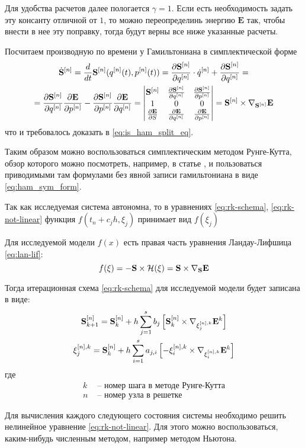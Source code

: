 Для удобства расчетов далее пологается $\gamma=1$. Если есть необходимость
задать эту консанту отличной от $1$, то можно переопределинь энергию $\mathbf
E$ так, чтобы внести в нее эту поправку, тогда будут верны все ниже указанные
расчеты.

Посчитаем производную по времени у Гамильтониана в симплектической
форме
\begin{multline}
    \dot{\mathbf S}^{[n]} = \frac{d}{dt}\mathbf S^{[n]}(q^{[n]}(t),p^{[n]}(t))=
    \frac{\partial \mathbf S^{[n]}}{\partial q^{[n]}} \cdot \dot q^{[n]} +
    \frac{\partial \mathbf S^{[n]}}{\partial q^{[n]}}
    =\\=
    \frac{\partial \mathbf S^{[n]}}{\partial q^{[n]}}
    \frac{\partial \mathbf E}{\partial p^{[n]}}
    -
    \frac{\partial \mathbf S^{[n]}}{\partial p^{[n]}}
    \frac{\partial \mathbf E}{\partial q^{[n]}}
    =
    \left|\begin{matrix}
        \mathbf{S}^{[n]} & \frac{\partial \mathbf{S}^{[n]}}{\partial q^{[n]}} &
        \frac{\partial \mathbf{S}^{[n]}}{\partial p^{[n]}}
        \\
        1 & 0 & 0
        \\
        \frac{\partial \mathbf E}{\partial S} &
        \frac{\partial \mathbf E}{\partial q^{[n]}} &
        \frac{\partial \mathbf E}{\partial p^{[n]}}
    \end{matrix}\right| = \mathbf{S}^{[n]} \times \nabla_{\mathbf{S}^{[n]}}\mathbf E
\end{multline}
что и требовалось доказать в \ref{eq:is_ham_split_eq}.

Таким образом можно воспользоваться симплектическим методом Рунге-Кутта,
обзор которого можно посмотреть, например, в статье \citet{Markiewicz1999},
и пользоваться приводимыми там
формулами без явной записи гамильтониана в виде \ref{eq:ham_sym_form}.


Так как исследуемая система автономна, то в уравнениях \ref{eq:rk-schema},
\ref{eq:rk-not-linear}
функция $f(t_n + c_jh, \xi_j)$ принимает вид $f(\xi_j)$

Для исследуемой модели $f(x)$ есть правая часть уравнения Ландау-Лифшица
\ref{eq:lan-lif}:
\begin{equation}
    f(\xi) = -\mathbf S \times \mathcal{H}(\xi) = \mathbf S \times \nabla_{\mathbf S}
    \mathbf E
\end{equation}

Тогда итерационная схема \ref{eq:rk-schema} для исследуемой
модели будет записана в виде:
\begin{gather}
    \mathbf S^{[n]}_{k+1} = \mathbf{S}^{[n]}_k + h\sum_{j=1}^s b_j \left[\mathbf{S}^{[n]}_k \times
    \nabla_{\xi^{[n],k}_j} \mathbf E^k \right]
    \\
    \xi_j^{[n], k} = \mathbf{S}^{[n]}_k + h\sum_{i=1}^s a_{j,i} \left[ -\xi_i^{[n],k}
    \times \nabla_{\xi^{[n],k}_i} \mathbf E^k \right]\label{eq:rk-not-linear}
\end{gather}
где
\begin{align}
    k &\text{ -- номер шага в методе Рунге-Кутта} \\
    n &\text{ -- номер узла в решетке}
\end{align}

Для вычисления каждого следующего состояния системы необходимо решить
нелинейное уравнение \ref{eq:rk-not-linear}. Для этого можно воспользоваться,
каким-нибудь численным методом, например методом Ньютона.

